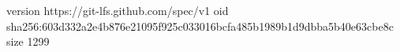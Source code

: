 version https://git-lfs.github.com/spec/v1
oid sha256:603d332a2e4b876e21095f925c033016bcfa485b1989b1d9dbba5b40e63cbe8c
size 1299
